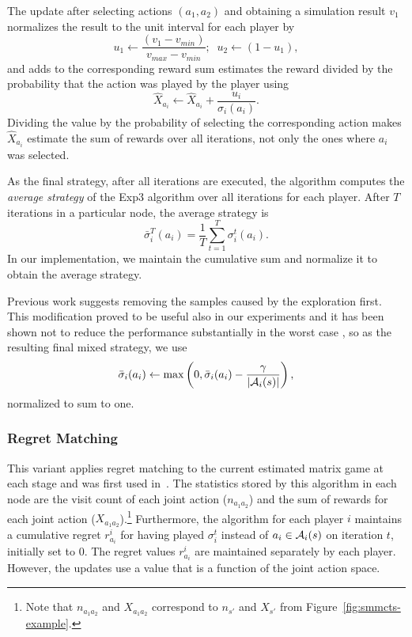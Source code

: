 The update after selecting actions $(a_1,a_2)$ and obtaining a simulation result $v_1$ normalizes the result to the unit interval for each player by
\begin{equation}
u_1 \leftarrow \frac{(v_1 - v_{min})}{v_{max} - v_{min}};\;\; u_2 \leftarrow (1-u_1),
\end{equation}
and adds to the corresponding reward sum estimates the reward divided by the probability that the action was played by the player using
\begin{equation}
\hat{X}_{a_i} \leftarrow \hat{X}_{a_i} + \frac{u_i}{\sigma_i(a_i)}.
\end{equation}
Dividing the value by the probability of selecting the corresponding action makes $\hat{X}_{a_i}$ estimate the sum of rewards over all
iterations, not only the ones where $a_i$ was selected.

As the final strategy, after all iterations are executed, the algorithm computes the \emph{average strategy} of the Exp3 algorithm over all iterations for each player.
 After $T$ iterations in a particular node, the average strategy is
\begin{equation}
\bar{\sigma}^T_i(a_i) = \frac{1}{T}\sum_{t=1}^T \sigma^t_i(a_i).
\label{eq:avg_strat}
\end{equation}
In our implementation, we maintain the cumulative sum and normalize it to obtain the average strategy.

Previous work \cite{Teytaud11Upper} suggests removing the samples caused by the exploration first.
This modification proved to be useful also in our experiments and it has been shown not to reduce the performance substantially in the worst case \cite{Kovarik2015Analysis},
so as the resulting final mixed strategy, we use
\begin{equation}
\bar{\sigma}_i(a_i) \leftarrow \max\left(0, \bar{\sigma}_i(a_i) - \frac{\gamma}{|\mathcal{A}_i(s)|}\right),
\end{equation}
normalized to sum to one.

\subsubsection{Regret Matching} \label{sec:rm}

This variant applies regret matching \cite{Hart00} to the current estimated matrix game at each stage and was first used in~\cite{Lanctot13Goofspiel}. The statistics stored by this algorithm in each node are the visit count of each joint action ($n_{a_1a_2}$) and the sum of rewards for each joint action ($X_{a_1a_2}$).\footnote{Note that $n_{a_1a_2}$ and $X_{a_1a_2}$ correspond to $n_{s'}$ and $X_{s'}$ from Figure~\ref{fig:smmcts-example}.}
Furthermore, the algorithm for each player $i$ maintains a cumulative regret $r^i_{a_i}$ for having played $\sigma_i^t$ instead of $a_i \in \mathcal{A}_i(s)$ on iteration $t$, initially set to 0. The regret values $r^i_{a_i}$ are maintained separately by each player. However, the updates use a value that is a function of the joint action space.

